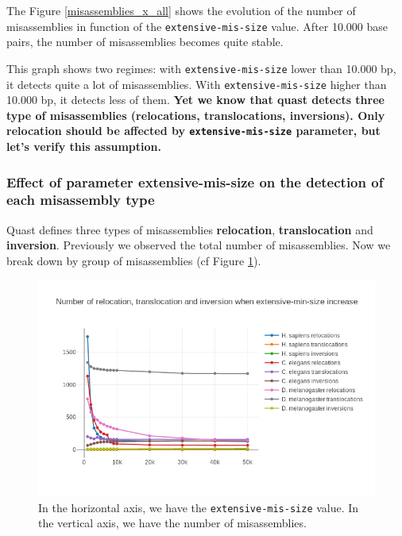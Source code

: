 \documentclass[./main.tex]{subfiles}
\begin{document}
The Figure \ref{misassemblies_x_all} shows the evolution of the number of misassemblies in
function of the \texttt{extensive-mis-size} value. After 10.000 base
pairs, the number of misassemblies becomes quite stable.

This graph shows two regimes: with \texttt{extensive-mis-size} lower
than 10.000 bp, it detects quite a lot of misassemblies. With
\texttt{extensive-mis-size} higher than 10.000 bp, it detects less of
them. \textbf{Yet we know that quast detects three type of misassemblies
(relocations, translocations, inversions). Only relocation should be
affected by \texttt{extensive-mis-size} parameter, but let's verify this
assumption.}

\subsubsection{Effect of parameter extensive-mis-size on the detection
of each misassembly type}

Quast defines three types of misassemblies \textbf{relocation},
\textbf{translocation} and \textbf{inversion}. Previously we observed
the total number of misassemblies. Now we break down by group of
misassemblies (cf Figure \ref{misassemblies_x_types}).

\begin{figure}[ht]
    \centering
    \includegraphics[width=\textwidth]{paper/misassemblies-in-noisy-assemblies/misassemblies_x_extensive_mis_size_type.png}
    \caption{In the horizontal axis, we have the \texttt{extensive-mis-size} value.
In the vertical axis, we have the number of misassemblies.}
    \label{misassemblies_x_types}
\end{figure}
\end{document}
